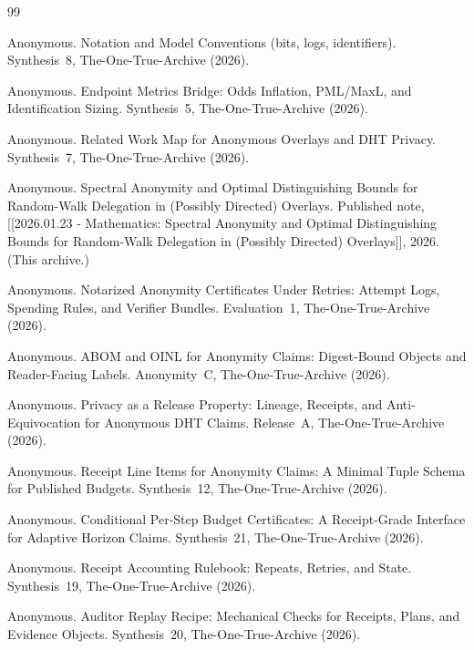 \documentclass[11pt]{article}
\begin{document}
\begin{thebibliography}{99}\small

Anonymous.
\newblock Notation and Model Conventions (bits, logs, identifiers).
\newblock Synthesis~8, The-One-True-Archive (2026).


Anonymous.
\newblock Endpoint Metrics Bridge: Odds Inflation, PML/MaxL, and Identification Sizing.
\newblock Synthesis~5, The-One-True-Archive (2026).

Anonymous.
\newblock Related Work Map for Anonymous Overlays and DHT Privacy.
\newblock Synthesis~7, The-One-True-Archive (2026).

Anonymous.
\newblock Spectral Anonymity and Optimal Distinguishing Bounds for Random-Walk Delegation in (Possibly Directed) Overlays.
\newblock Published note, [[2026.01.23 - Mathematics: Spectral Anonymity and Optimal Distinguishing Bounds for Random-Walk Delegation in (Possibly Directed) Overlays]], 2026. (This archive.)

Anonymous.
\newblock Notarized Anonymity Certificates Under Retries: Attempt Logs, Spending Rules, and Verifier Bundles.
\newblock Evaluation~1, The-One-True-Archive (2026).

Anonymous.
\newblock ABOM and OINL for Anonymity Claims: Digest-Bound Objects and Reader-Facing Labels.
\newblock Anonymity~C, The-One-True-Archive (2026).

Anonymous.
\newblock Privacy as a Release Property: Lineage, Receipts, and Anti-Equivocation for Anonymous DHT Claims.
\newblock Release~A, The-One-True-Archive (2026).

Anonymous.
\newblock Receipt Line Items for Anonymity Claims: A Minimal Tuple Schema for Published Budgets.
\newblock Synthesis~12, The-One-True-Archive (2026).

Anonymous.
\newblock Conditional Per-Step Budget Certificates: A Receipt-Grade Interface for Adaptive Horizon Claims.
\newblock Synthesis~21, The-One-True-Archive (2026).

Anonymous.
\newblock Receipt Accounting Rulebook: Repeats, Retries, and State.
\newblock Synthesis~19, The-One-True-Archive (2026).

Anonymous.
\newblock Auditor Replay Recipe: Mechanical Checks for Receipts, Plans, and Evidence Objects.
\newblock Synthesis~20, The-One-True-Archive (2026).

\end{thebibliography}
\end{document}
